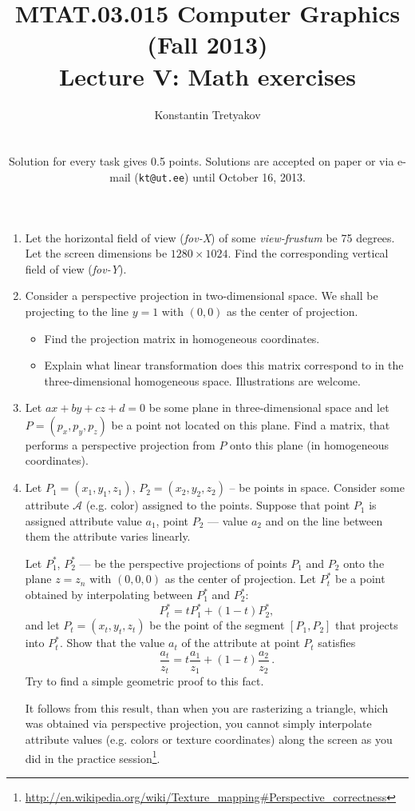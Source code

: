 \documentclass{article}
\begin{document}
\title{MTAT.03.015 Computer Graphics (Fall 2013)\\
Lecture V: Math exercises}
\author{Konstantin Tretyakov\\
\medskip
\\
\parbox{9cm}{\small Solution for every task gives 0.5 points. Solutions are accepted on paper or via e-mail (\texttt{kt@ut.ee}) until October 16, 2013.}
}
\date{}
\maketitle


\begin{enumerate}

\item Let the horizontal field of view (\emph{fov-X}) of some \emph{view-frustum} be 75 degrees. Let the screen dimensions be $1280\times 1024$. Find the corresponding vertical field of view  (\emph{fov-Y}).

\item Consider a perspective projection in two-dimensional space. We shall be projecting to the line $y = 1$ with $(0, 0)$ as the center of projection.
\begin{itemize}
	\item Find the projection matrix in homogeneous coordinates.
	\item Explain what linear transformation does this matrix correspond to in the three-dimensional homogeneous space. Illustrations are welcome.
\end{itemize}

\item Let $ax + by + cz + d = 0$ be some plane in three-dimensional space and let $P = (p_x, p_y, p_z)$ be a point not located on this plane. Find a matrix, that performs a perspective projection from $P$ onto this plane (in homogeneous coordinates).

\item Let $P_1 = (x_1, y_1, z_1)$, $P_2 = (x_2, y_2, z_2)$ -- be points in space. Consider some attribute $\mathcal{A}$ (e.g. color) assigned to the points. Suppose that point $P_1$ is assigned attribute value $a_1$, point $P_2$ --- value $a_2$ and on the line between them the attribute varies linearly.

Let $P_1^*$, $P_2^*$ --- be the perspective projections of points $P_1$ and $P_2$ onto the plane $z = z_n$ with $(0, 0, 0)$ as the center of projection.
Let $P_t^*$ be a point obtained by interpolating between $P_1^*$ and $P_2^*$: 
$$P_t^* = tP_1^* + (1-t)P_2^*,$$
and let $P_t = (x_t, y_t, z_t)$ be the point of the segment $[P_1, P_2]$ that projects into $P_t^*$. Show that the value $a_t$ of the attribute at point $P_t$ satisfies
\[ \frac{a_t}{z_t} = t \frac{a_1}{z_1} + (1-t)\frac{a_2}{z_2}\, .\]
Try to find a simple geometric proof to this fact.

It follows from this result, than when you are rasterizing a triangle, which was obtained via perspective projection, you cannot simply interpolate attribute values (e.g. colors or texture coordinates) along the screen as you did in the practice session\footnote{\url{http://en.wikipedia.org/wiki/Texture_mapping\#Perspective_correctness}}.

\end{enumerate}
\end{document}

